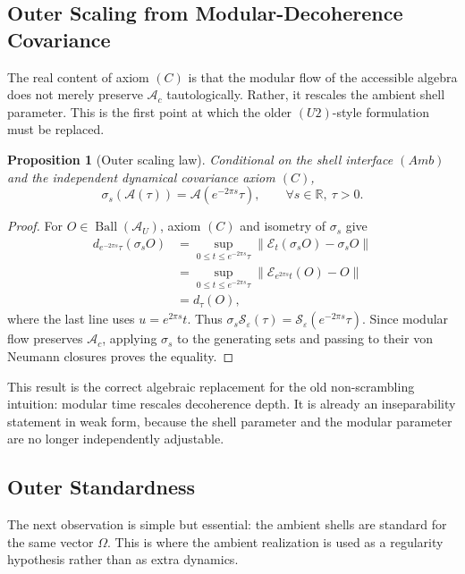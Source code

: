 \documentclass[12pt]{article}
\newtheorem{proposition}[theorem]{Proposition}
\theoremstyle{definition}
\theoremstyle{remark}
\begin{document}
\subsection{Outer Scaling from Modular-Decoherence
Covariance}\label{outer-scaling-from-modular-decoherence-covariance}

The real content of axiom \((C)\) is that the modular flow of the
accessible algebra does not merely preserve \(\mathcal{A}_c\)
tautologically. Rather, it rescales the ambient shell parameter. This is
the first point at which the older \((U2)\)-style formulation must be
replaced.

\begin{proposition}[Outer scaling law]\label{prop:4.1}
Conditional on the shell interface \((Amb)\) and the independent
dynamical covariance axiom \((C)\), \[
\sigma_s(\mathcal{A}(\tau))=\mathcal{A}(e^{-2\pi s}\tau),
\qquad
\forall s\in\mathbb{R},\ \tau>0.
\]
\end{proposition}

\begin{proof}
For \(O\in\operatorname{Ball}(\mathcal{A}_U)\), axiom \((C)\) and
isometry of \(\sigma_s\) give
\begin{align*}
d_{e^{-2\pi s}\tau}(\sigma_s O)
&=\sup_{0\le t\le e^{-2\pi s}\tau}
  \|\mathcal{E}_t(\sigma_sO)-\sigma_sO\|\\
&=\sup_{0\le t\le e^{-2\pi s}\tau}
  \|\mathcal{E}_{e^{2\pi s}t}(O)-O\|\\
&=d_\tau(O),
\end{align*}
where the last line uses \(u=e^{2\pi s}t\). Thus
\(\sigma_s\mathcal{S}_\varepsilon(\tau)
=\mathcal{S}_\varepsilon(e^{-2\pi s}\tau)\). Since modular flow
preserves \(\mathcal{A}_c\), applying \(\sigma_s\) to the generating
sets and passing to their von Neumann closures proves the equality.
\end{proof}

This result is the correct algebraic replacement for the old
non-scrambling intuition: modular time rescales decoherence depth. It is
already an inseparability statement in weak form, because the shell
parameter and the modular parameter are no longer independently
adjustable.

\subsection{Outer Standardness}\label{outer-standardness}

The next observation is simple but essential: the ambient shells are
standard for the same vector \(\Omega\). This is where the ambient
realization is used as a regularity hypothesis rather than as extra
dynamics.
\end{document}
